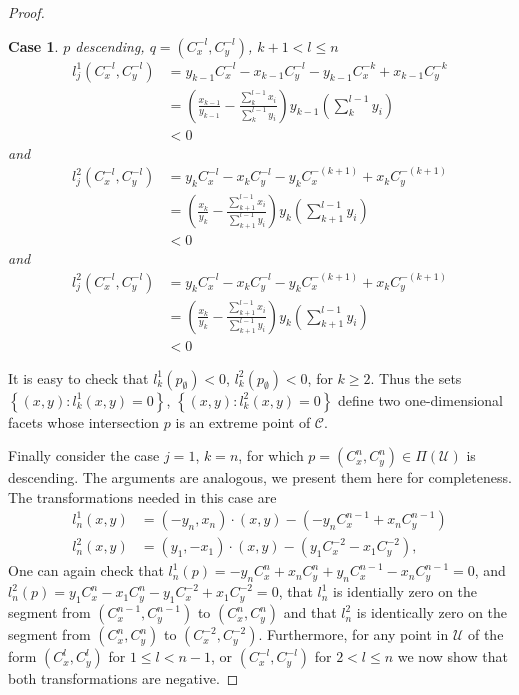 \documentclass{article}
\theoremstyle{case}
\newtheorem{case}{Case}
\begin{document}
\begin{proof}
%
%
\begin{case} $p$ descending, $q = \left( C_x^{-l}, C_y^{-l}\right)$, $k+1 < l \leq n$
\begin{align*}
l_j^1\left(C_x^{-l}, C_y^{-l}\right) &= y_{k-1}C_x^{-l} - x_{k-1}C_y^{-l} - y_{k-1}C_x^{-k} + x_{k-1}C_y^{-k} \\
&= \left( \frac{x_{k-1}}{y_{k-1}} - \frac{\sum_k^{l-1} x_i}{\sum_k^{l-1} y_i}\right)y_{k-1}\left( \sum_k^{l-1}y_i\right) \\
&< 0
\end{align*}
and
\begin{align*}
l_j^2\left(C_x^{-l}, C_y^{-l}\right) &= y_kC_x^{-l} - x_kC_y^{-l} - y_kC_x^{-(k+1)} + x_kC_y^{-(k+1)} \\
&= \left( \frac{x_k}{y_k} - \frac{\sum_{k+1}^{l-1}x_i}{\sum_{k+1}^{l-1}y_i}\right)y_k\left( \sum_{k+1}^{l-1} y_i\right) \\
&< 0
\end{align*}
and 
\begin{align*}
l_j^2\left(C_x^{-l}, C_y^{-l}\right) &= y_kC_x^{-l} - x_kC_y^{-l} - y_kC_x^{-(k+1)} + x_kC_y^{-(k+1)} \\
&= \left( \frac{x_k}{y_k} - \frac{\sum_{k+1}^{l-1}x_i}{\sum_{k+1}^{l-1}y_i}\right)y_k\left( \sum_{k+1}^{l-1}y_i\right) \\
&< 0
\end{align*}
\end{case}

\noindent It is easy to check that $l_k^1\left( p_{\emptyset}\right) <0$, $l_k^2\left( p_{\emptyset}\right) < 0$, for $k \geq 2$. Thus the sets $\left\lbrace \left( x,y\right) \colon l_k^1\left( x,y\right) = 0\right\rbrace$, $\left\lbrace \left( x,y\right) \colon l_k^2\left( x,y\right) = 0\right\rbrace$ define two one-dimensional facets whose intersection $p$ is an extreme point of $\mathcal{C}$.

Finally consider the case $j = 1$, $k = n$, for which $p =\left( C_x^n, C_y^n \right) \in \Pi\left( \mathcal{U}\right)$ is descending. The arguments are analogous, we present them here for completeness. The transformations needed in this case are
\begin{align*}
l_n^1\left( x,y\right) &= \left( -y_n, x_n\right) \cdot \left( x,y\right) - \left( -y_nC_x^{n-1} + x_nC_y^{n-1}\right) \\
l_n^2\left( x,y\right) &= \left( y_1, -x_1\right) \cdot \left( x,y\right) - \left( y_1C_x^{-2} - x_1C_y^{-2}\right),
\end{align*}
One can again check that $l_n^1\left( p\right) = -y_nC_x^n + x_nC_y^n + y_nC_x^{n-1} - x_nC_y^{n-1} = 0$, and $l_n^2\left( p\right) = y_1C_x^n - x_1C_y^n - y_1C_x^{-2} + x_1C_y^{-2} = 0$, that $l_n^1$ is identially zero on the segment from $\left( C_x^{n-1}, C_y^{n-1}\right)$ to $\left( C_x^n, C_y^n\right)$ and that $l_n^2$ is identically zero on the segment from $\left( C_x^n, C_y^n\right)$ to $\left( C_x^{-2}, C_y^{-2}\right)$. Furthermore, for any point in $\mathcal{U}$ of the form $\left( C_x^l, C_y^l\right)$ for $1 \leq l < n-1$, or $\left( C_x^{-l}, C_y^{-l}\right)$ for $2 < l \leq n$ we now show that both transformations are negative.


\end{proof}
\end{document}
